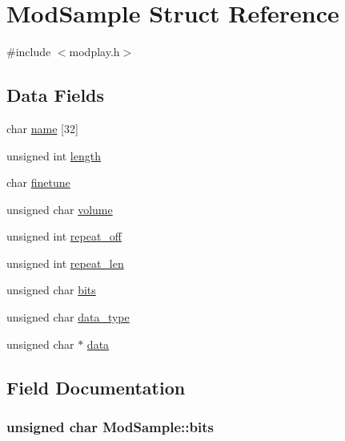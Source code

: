 \hypertarget{structModSample}{}\section{Mod\+Sample Struct Reference}
\label{structModSample}


{\ttfamily \#include $<$modplay.\+h$>$}

\subsection*{Data Fields}
\begin{DoxyCompactItemize}
\item 
char \hyperlink{structModSample_ac557c5bab221399a0976b6f32e92303e}{name} \mbox{[}32\mbox{]}
\item 
unsigned int \hyperlink{structModSample_a429b774753d1da7e00600b42b6837430}{length}
\item 
char \hyperlink{structModSample_a079ed1256b8178f1ad66da5e614b3c0d}{finetune}
\item 
unsigned char \hyperlink{structModSample_a4162e3c9eb5e2a13fd90f871fc2d950e}{volume}
\item 
unsigned int \hyperlink{structModSample_aa2222ff52c86152fc631171db9113290}{repeat\+\_\+off}
\item 
unsigned int \hyperlink{structModSample_a1426ae72bf07dacde5539181b18ea001}{repeat\+\_\+len}
\item 
unsigned char \hyperlink{structModSample_a990cb7f8494ef1b606cd8e70655f8c6d}{bits}
\item 
unsigned char \hyperlink{structModSample_a1f3a47637cbfdd492f7af32c4226c9d3}{data\+\_\+type}
\item 
unsigned char $\ast$ \hyperlink{structModSample_a541eeaaeb296d97b69f9cc00d9cb3d3b}{data}
\end{DoxyCompactItemize}


\subsection{Field Documentation}
\hypertarget{structModSample_a990cb7f8494ef1b606cd8e70655f8c6d}{}
\subsubsection[{bits}]{\setlength{\rightskip}{0pt plus 5cm}unsigned char Mod\+Sample\+::bits}\label{structModSample_a990cb7f8494ef1b606cd8e70655f8c6d}
\hypertarget{structModSample_a541eeaaeb296d97b69f9cc00d9cb3d3b}{}
